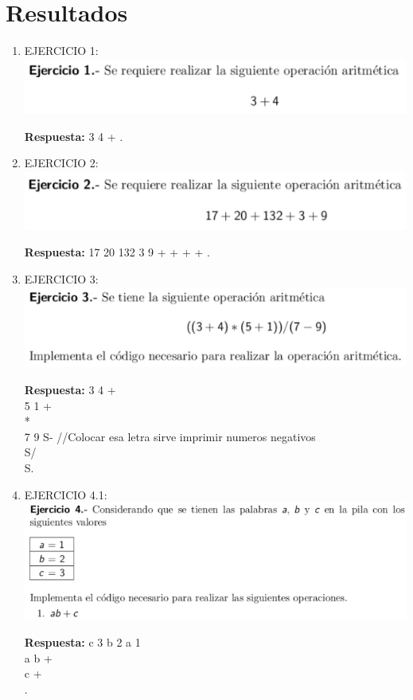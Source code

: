 \documentclass[conference]{IEEEtran}
\begin{document}
\section{Resultados}
\begin{enumerate}
\item  EJERCICIO 1:\\
	\includegraphics{e1}\\
	\begin{center}
	\textbf{Respuesta: }3 4 + .
	\end{center}
	
\item EJERCICIO 2: \\
	\includegraphics{e2}\\
	\begin{center}
	\textbf{Respuesta: } 17 20 132 3 9 + + + + . 
	\end{center}
	
\item EJERCICIO 3: \\
	\includegraphics{e3}\\
	\begin{center}
	\textbf{Respuesta: } 3 4 + \\ 5 1 + \\ * \\ 7 9 S- //Colocar esa letra sirve imprimir numeros negativos \\ S/ \\ S.
	\end{center}	
	
\item EJERCICIO 4.1: \\
	\includegraphics{e4.1}
	\begin{center}
	\textbf{Respuesta: } c 3 b 2 a 1 \\ a b + \\ c + \\ .
	\end{center}	
	

\end{enumerate}
\end{document}
